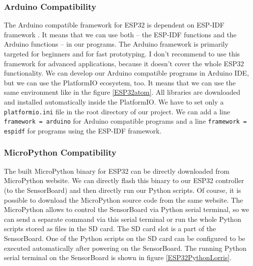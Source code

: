 \subsubsection{Arduino Compatibility}
The Arduino compatible framework for ESP32 \cite{espressif:ArduinoCore} is dependent on \ac{ESP-IDF} framework \cite{espressif:ESP-IDF}. It means that we can use both -- the \ac{ESP-IDF} functions and the Arduino functions -- in our programs. The Arduino framework is primarily targeted for beginners and for fast prototyping. I don't recommend to use this framework for advanced applications, because it doesn't cover the whole ESP32 functionality. We can develop our Arduino compatible programs in Arduino IDE, but we can use the PlatformIO ecosystem, too. It means that we can use the same environment like in the figure \ref{ESP32atom}. All libraries are downloaded and installed automatically inside the PlatformIO. We have to set only a \texttt{platformio.ini} file in the root directory of our project. We can add a line \texttt{framework = arduino} for Arduino compatible programs and a line \texttt{framework = espidf} for programs using the \ac{ESP-IDF} framework.

\subsubsection{MicroPython Compatibility}
The built MicroPython binary for ESP32 can be directly downloaded from MicroPython website. \cite{MicroPython} We can directly flash this binary to our ESP32 controller (to the SensorBoard) and then directly run our Python scripts. Of course, it is possible to download the MicroPython source code from the same website. The MicroPython allows to control the SensorBoard via Python serial terminal, so we can send a separate command via this serial terminal or run the whole Python scripts stored as files in the SD card. The SD card slot is a part of the SensorBoard. One of the Python scripts on the SD card can be configured to be executed automatically after powering on the SensorBoard. The running Python serial terminal on the SensorBoard is shown in figure \ref{ESP32PythonLorris}.


